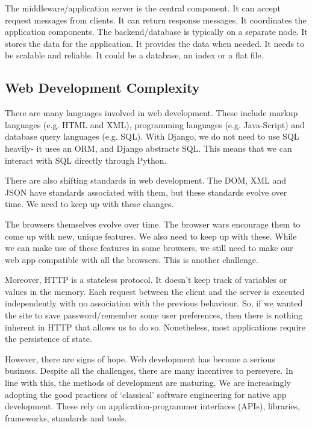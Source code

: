 \documentclass[a4paper, openany]{memoir}
\begin{document}
    \noindent The middleware/application server is the central component. It can accept request messages from clients. It can return response messages. It coordinates the application components. The backend/database is typically on a separate node. It stores the data for the application. It provides the data when needed. It needs to be scalable and reliable. It could be a database, an index or a flat file.

    \subsection{Web Development Complexity}
    There are many languages involved in web development. These include markup languages (e.g. HTML and XML), programming languages (e.g. Java-Script) and database query languages (e.g. SQL). With Django, we do not need to use SQL heavily- it uses an ORM, and Django abstracts SQL. This means that we can interact with SQL directly through Python.

    \noindent There are also shifting standards in web development. The DOM, XML and JSON have standards associated with them, but these standards evolve over time. We need to keep up with these changes.

    \noindent The browsers themselves evolve over time. The browser wars encourage them to come up with new, unique features. We also need to keep up with these. While we can make use of these features in some browsers, we still need to make our web app compatible with all the browsers. This is another challenge.

    \noindent Moreover, HTTP is a stateless protocol. It doesn't keep track of variables or values in the memory. Each request between the client and the server is executed independently with no association with the previous behaviour. So, if we wanted the site to save password/remember some user preferences, then there is nothing inherent in HTTP that allows us to do so. Nonetheless, most applications require the persistence of state.

    \noindent However, there are signs of hope. Web development has become a serious business. Despite all the challenges, there are many incentives to persevere. In line with this, the methods of development are maturing. We are increasingly adopting the good practices of `classical' software engineering for native app development. These rely on application-programmer interfaces (APIs), libraries, frameworks, standards and tools.
\end{document}
